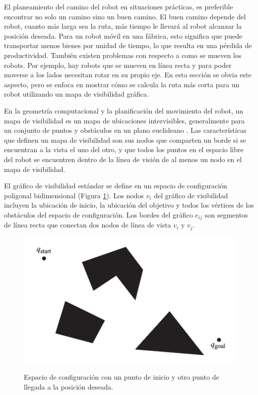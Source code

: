 El planeamiento del camino del robot en situaciones pr\'acticas, es preferible 
encontrar no solo un camino sino un buen camino. El buen camino depende del 
robot, cuanto m\'as larga sea la ruta, m\'as tiempo le llevar\'a al robot 
alcanzar la posici\'on deseada. Para un robot m\'ovil en una f\'abrica, esto 
significa que puede transportar menos bienes por unidad de tiempo, lo que 
resulta en una p\'erdida de productividad. Tambi\'en existen problemas con 
respecto a como se mueven los robots. Por ejemplo, hay robots que se mueven 
en l\'inea recta y para poder moverse a los lados necesitan rotar en su 
propio eje. En esta secci\'on se obvia este aspecto, pero se enfoca en 
mostrar c\'omo se calcula la ruta m\'as corta para un robot utilizando 
un mapa de visibilidad gr\'afica.


En la geometr\'ia computacional y la planificaci\'on del movimiento del 
robot, un mapa de visibilidad es un mapa de ubicaciones intervisibles, 
generalmente para un conjunto de puntos y obst\'aculos en un plano 
euclideano \cite{wikiVisibilityGraph}. Las caracter\'isticas que definen 
un mapa de visibilidad son sus nodos que comparten un borde si se encuentran 
a la vista el uno del otro, y que todos los puntos en el espacio libre del 
robot se encuentren dentro de la l\'inea de visi\'on de al menos un nodo 
en el mapa de visibilidad. 

El gr\'afico de visibilidad est\'andar se define en un espacio de 
configuraci\'on poligonal bidimensional (Figura \ref{f:mapPolygonal}). Los 
nodos $v_{i}$ del gr\'afico de visibilidad incluyen la ubicaci\'on de 
inicio, la ubicaci\'on del objetivo y todos los v\'ertices de los obst\'aculos 
del espacio de configuraci\'on. Los bordes del gr\'afico $e_{ij}$ son 
segmentos de l\'inea recta que conectan dos nodos de l\'inea de vista $v_{i}$ 
y $v_{j}$.

\begin{figure}%
\centering \footnotesize
 {\includegraphics[width=0.60\linewidth]{images/map_polygonal.png}}
 \captionsetup{font=footnotesize}
 \caption{Espacio de configuraci\'on con un punto de inicio y otro punto 
 de llegada a la posici\'on deseada.}
\label{f:mapPolygonal}
\end{figure}


